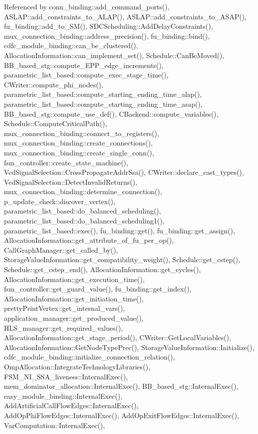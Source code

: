 Referenced by conn\+\_\+binding\+::add\+\_\+command\+\_\+ports(), A\+S\+L\+A\+P\+::add\+\_\+constraints\+\_\+to\+\_\+\+A\+L\+A\+P(), A\+S\+L\+A\+P\+::add\+\_\+constraints\+\_\+to\+\_\+\+A\+S\+A\+P(), fu\+\_\+binding\+::add\+\_\+to\+\_\+\+S\+M(), S\+D\+C\+Scheduling\+::\+Add\+Delay\+Constraints(), mux\+\_\+connection\+\_\+binding\+::address\+\_\+precision(), fu\+\_\+binding\+::bind(), cdfc\+\_\+module\+\_\+binding\+::can\+\_\+be\+\_\+clustered(), Allocation\+Information\+::can\+\_\+implement\+\_\+set(), Schedule\+::\+Can\+Be\+Moved(), B\+B\+\_\+based\+\_\+stg\+::compute\+\_\+\+E\+P\+P\+\_\+edge\+\_\+increments(), parametric\+\_\+list\+\_\+based\+::compute\+\_\+exec\+\_\+stage\+\_\+time(), C\+Writer\+::compute\+\_\+phi\+\_\+nodes(), parametric\+\_\+list\+\_\+based\+::compute\+\_\+starting\+\_\+ending\+\_\+time\+\_\+alap(), parametric\+\_\+list\+\_\+based\+::compute\+\_\+starting\+\_\+ending\+\_\+time\+\_\+asap(), B\+B\+\_\+based\+\_\+stg\+::compute\+\_\+use\+\_\+def(), C\+Backend\+::compute\+\_\+variables(), Schedule\+::\+Compute\+Critical\+Path(), mux\+\_\+connection\+\_\+binding\+::connect\+\_\+to\+\_\+registers(), mux\+\_\+connection\+\_\+binding\+::create\+\_\+connections(), mux\+\_\+connection\+\_\+binding\+::create\+\_\+single\+\_\+conn(), fsm\+\_\+controller\+::create\+\_\+state\+\_\+machine(), Vcd\+Signal\+Selection\+::\+Cross\+Propagate\+Addr\+Ssa(), C\+Writer\+::declare\+\_\+cast\+\_\+types(), Vcd\+Signal\+Selection\+::\+Detect\+Invalid\+Returns(), mux\+\_\+connection\+\_\+binding\+::determine\+\_\+connection(), p\+\_\+update\+\_\+check\+::discover\+\_\+vertex(), parametric\+\_\+list\+\_\+based\+::do\+\_\+balanced\+\_\+scheduling(), parametric\+\_\+list\+\_\+based\+::do\+\_\+balanced\+\_\+scheduling1(), parametric\+\_\+list\+\_\+based\+::exec(), fu\+\_\+binding\+::get(), fu\+\_\+binding\+::get\+\_\+assign(), Allocation\+Information\+::get\+\_\+attribute\+\_\+of\+\_\+fu\+\_\+per\+\_\+op(), Call\+Graph\+Manager\+::get\+\_\+called\+\_\+by(), Storage\+Value\+Information\+::get\+\_\+compatibility\+\_\+weight(), Schedule\+::get\+\_\+cstep(), Schedule\+::get\+\_\+cstep\+\_\+end(), Allocation\+Information\+::get\+\_\+cycles(), Allocation\+Information\+::get\+\_\+execution\+\_\+time(), fsm\+\_\+controller\+::get\+\_\+guard\+\_\+value(), fu\+\_\+binding\+::get\+\_\+index(), Allocation\+Information\+::get\+\_\+initiation\+\_\+time(), pretty\+Print\+Vertex\+::get\+\_\+internal\+\_\+vars(), application\+\_\+manager\+::get\+\_\+produced\+\_\+value(), H\+L\+S\+\_\+manager\+::get\+\_\+required\+\_\+values(), Allocation\+Information\+::get\+\_\+stage\+\_\+period(), C\+Writer\+::\+Get\+Local\+Variables(), Allocation\+Information\+::\+Get\+Node\+Type\+Prec(), Storage\+Value\+Information\+::\+Initialize(), cdfc\+\_\+module\+\_\+binding\+::initialize\+\_\+connection\+\_\+relation(), Omp\+Allocation\+::\+Integrate\+Technology\+Libraries(), F\+S\+M\+\_\+\+N\+I\+\_\+\+S\+S\+A\+\_\+liveness\+::\+Internal\+Exec(), mem\+\_\+dominator\+\_\+allocation\+::\+Internal\+Exec(), B\+B\+\_\+based\+\_\+stg\+::\+Internal\+Exec(), easy\+\_\+module\+\_\+binding\+::\+Internal\+Exec(), Add\+Artificial\+Call\+Flow\+Edges\+::\+Internal\+Exec(), Add\+Op\+Phi\+Flow\+Edges\+::\+Internal\+Exec(), Add\+Op\+Exit\+Flow\+Edges\+::\+Internal\+Exec(), Var\+Computation\+::\+Internal\+Exec(), 